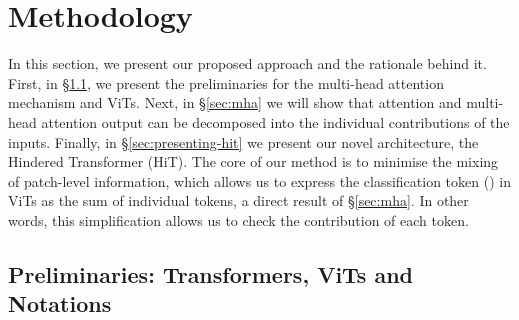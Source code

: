 \section{Methodology}



In this section, we present our proposed approach and the rationale behind it. First, in \S\ref{sec:prelim-hit}, we present the preliminaries for the multi-head attention mechanism and ViTs. Next, in \S\ref{sec:mha} we will show that attention and multi-head attention output can be decomposed into the individual contributions of the inputs. Finally, in \S\ref{sec:presenting-hit} we present our novel architecture, the Hindered Transformer (HiT). The core of our method is to minimise the mixing of patch-level information, which allows us to express the classification token (\CLS) in ViTs as the sum of individual tokens, a direct result of \S\ref{sec:mha}. In other words, this simplification allows us to check the contribution of each token.

\subsection{Preliminaries: Transformers, ViTs and Notations}\label{sec:prelim-hit}

